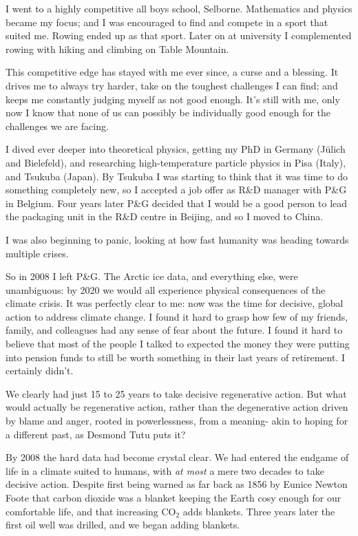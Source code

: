 I went to a highly competitive all boys school, Selborne. Mathematics and physics became my focus; and I was encouraged to find and compete in a sport that suited me. Rowing ended up as that sport. Later on at university I complemented rowing with hiking and climbing on Table Mountain.


This competitive edge has stayed with me ever since, a curse and a blessing. It drives me to always try harder, take on the toughest challenges I can find; and keeps me constantly judging myself as not good enough. It's still with me, only now I know that none of us can possibly be individually good enough for the challenges we are facing.


I dived ever deeper into theoretical physics, getting my PhD in Germany (J\"ulich and Bielefeld), and researching high-temperature particle physics in Pisa (Italy), and Tsukuba (Japan). By Tsukuba I was starting to think that it was time to do something completely new, so I accepted a job offer as R\&D manager with P\&G in Belgium. Four years later P\&G decided that I would be a good person to lead the packaging unit in the R\&D centre in Beijing, and so I moved to China.


I was also beginning to panic, looking at how fast humanity was heading towards multiple crises. 


So in 2008 I left P\&G. The Arctic ice data, and everything else, were unambiguous: by 2020 we would all experience physical consequences of the climate crisis. It was perfectly clear to me: now was the time for decisive, global action to address climate change. I found it hard to grasp how few of my friends, family, and colleagues had any sense of fear about the future. I found it hard to believe that most of the people I talked to expected the money they were putting into pension funds to still be worth something in their last years of retirement. I certainly didn't.


We clearly had just 15 to 25 years to take decisive regenerative action. But what would actually be regenerative action, rather than the degenerative action driven by blame and anger, rooted in powerlessness, from a meaning\hyp{} akin to hoping for a different past, as Desmond Tutu  puts it?


By 2008 the hard data had become crystal clear. We had entered the endgame of life in a climate suited to humans, with \emph{at most} a mere two decades to take decisive action. Despite first being warned as far back as 1856 by Eunice Newton Foote\cite{foote-greenhouse-gas} that carbon dioxide was a blanket keeping the Earth cosy enough for our comfortable life, and that increasing CO$_2$ adds blankets. Three years later the first oil well was drilled, and we began adding blankets. 


